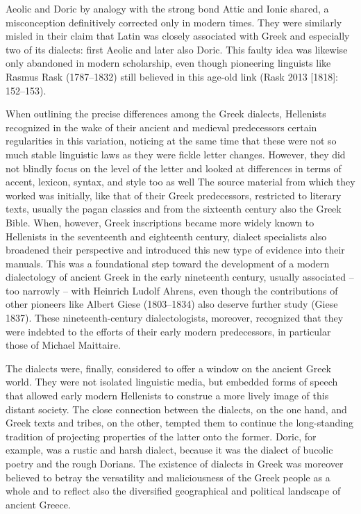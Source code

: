 \begin{styleStandard}
Aeolic and Doric by analogy with the strong bond Attic and Ionic shared, a misconception definitively corrected only in modern times. They were similarly misled in their claim that Latin was closely associated with Greek and especially two of its dialects: first Aeolic and later also Doric. This faulty idea was likewise only abandoned in modern scholarship, even though pioneering linguists like Rasmus Rask (1787–1832) still believed in this age-old link (Rask 2013 [1818]: 152–153).
\end{styleStandard}

\begin{styleStandard}
When outlining the precise differences among the Greek dialects, Hellenists recognized in the wake of their ancient and medieval predecessors certain regularities in this variation, noticing at the same time that these were not so much stable linguistic laws as they were fickle letter changes. However, they did not blindly focus on the level of the letter and looked at differences in terms of accent, lexicon, syntax, and style too as well The source material from which they worked was initially, like that of their Greek predecessors, restricted to literary texts, usually the pagan classics and from the sixteenth century also the Greek Bible. When, however, Greek inscriptions became more widely known to Hellenists in the seventeenth and eighteenth century, dialect specialists also broadened their perspective and introduced this new type of evidence into their manuals. This was a foundational step toward the development of a modern dialectology of ancient Greek in the early nineteenth century, usually associated – too narrowly – with Heinrich Ludolf Ahrens, even though the contributions of other pioneers like Albert Giese (1803–1834) also deserve further study (Giese 1837). These nineteenth-century dialectologists, moreover, recognized that they were indebted to the efforts of their early modern predecessors, in particular those of Michael Maittaire.
\end{styleStandard}

\begin{styleStandard}
The dialects were, finally, considered to offer a window on the ancient Greek world. They were not isolated linguistic media, but embedded forms of speech that allowed early modern Hellenists to construe a more lively image of this distant society. The close connection between the dialects, on the one hand, and Greek texts and tribes, on the other, tempted them to continue the long-standing tradition of projecting properties of the latter onto the former. Doric, for example, was a rustic and harsh dialect, because it was the dialect of bucolic poetry and the rough Dorians. The existence of dialects in Greek was moreover believed to betray the versatility and maliciousness of the Greek people as a whole and to reflect also the diversified geographical and political landscape of ancient Greece.
\end{styleStandard}

